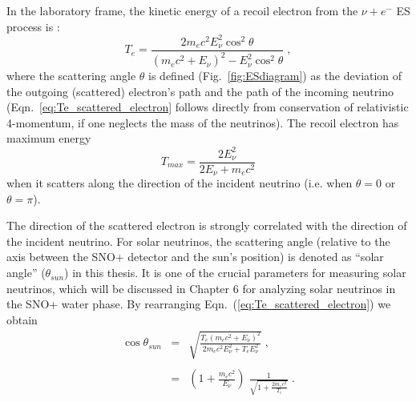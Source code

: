 In the laboratory frame, the kinetic energy of a recoil electron from the $\nu+e^-$ ES process is \cite{giunti2007fundamentals}:
\begin{equation}\label{eq:Te_scattered_electron}
T_e = \frac{2m_e c^2 E_\nu^2\cos^2\theta}{(m_e c^2 +E_\nu)^2-E_\nu^2\cos^2\theta}\;,
\end{equation}
where the scattering angle $\theta$ is defined (Fig.~\ref{fig:ESdiagram}) as the deviation of the outgoing (scattered) electron's path and the path of the incoming neutrino (Eqn.~\ref{eq:Te_scattered_electron} follows directly from conservation of relativistic 4-momentum, if one neglects the mass of the neutrinos). The recoil electron has maximum energy 
\begin{equation}
T_{max}=\frac{2E^2_\nu}{2E_\nu+m_e c^2} 
\end{equation}
when it scatters along the direction of the incident neutrino (i.e. when $\theta=0$ or $\theta=\pi$).

The direction of the scattered electron is strongly correlated with the direction of the incident neutrino. For solar neutrinos, the scattering angle (relative to the axis between the SNO+ detector and the sun's position) is denoted as ``solar angle'' ($\theta_{sun}$) in this thesis. It is one of the crucial parameters for measuring solar neutrinos, which will be discussed in Chapter 6 for analyzing solar neutrinos in the SNO+ water phase. By rearranging Eqn.~(\ref{eq:Te_scattered_electron}) we obtain \cite{giunti2007fundamentals}
\begin{eqnarray}\label{eq:costhetaSun}
\cos\theta_{sun} &=& \sqrt{\frac{T_e(m_e c^2 + E_\nu)^2}{2m_e c^2 E_\nu^2+T_eE_\nu^2}} \; , \nonumber \\
                 &\;& \\
                 &=& \left( 1 + \frac{m_e c^2}{E_{\nu}} \right) \; \frac{1}{\sqrt{1 + \frac{2 m_e c^2}{T_e}}} \; \nonumber.
\end{eqnarray}

